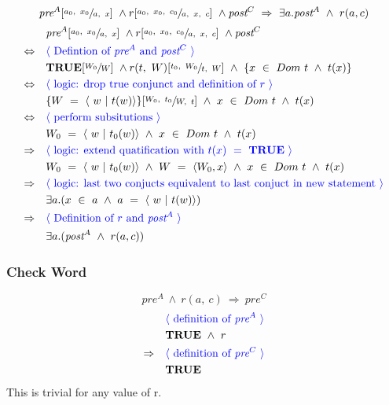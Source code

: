 \documentclass[a4paper, fleqn]{article}
\newcommand{\reason}[1]{\text{\textcolor{blue}{$\langle$ #1 $\rangle$}}}
\begin{document}
$$\textit{pre}^A[\sfrac{a_0,\ x_0}{a,\ x}]\ \land r[\sfrac{a_0,\ x_0,\ c_0}{a,\ x,\ c}]\ \land \textit{post}^{C}\ \Rightarrow\ \exists a.\textit{post}^A\ \land\ r(a, c)$$
\begin{align*}
		&\quad \textit{pre}^A[\sfrac{a_0,\ x_0}{a,\ x}]\ \land r[\sfrac{a_0,\ x_0,\ c_0}{a,\ x,\ c}]\ \land \textit{post}^{C} \\
		\Leftrightarrow&\quad \reason{Defintion of $\textit{pre}^A$ and $\textit{post}^C$} \\
		&\quad \textbf{TRUE}[\sfrac{W_0}{W}]\ \land r(t,\ W)[\sfrac{t_0,\ W_0}{t,\ W}]\ \land\ \{x\ \in\ Dom\ t\ \land\ t(x)\}\\
		\Leftrightarrow&\quad \reason{logic: drop true conjunct and definition of $r$} \\
		&\quad \{W\ =\ \langle\ w\ |\ t(w)\rangle\}[\sfrac{W_0,\ t_0}{W,\ t}]\ \land\  x\ \in\ Dom\ t\ \land\ t(x) \\
		\Leftrightarrow&\quad \reason{perform subsitutions} \\
		&\quad W_0\ =\ \langle\ w\ |\ t_0(w)\rangle\ \land\ x\ \in\ Dom\ t\ \land\ t(x)\\
		\Rightarrow&\quad\reason{logic: extend quatification with $t(x)\ =\ \textbf{TRUE}$} \\
		&\quad W_0\ =\ \langle\ w\ |\ t_0(w)\rangle\ \land\ W\ =\ \langle W_0, x\rangle\ \land\ x\ \in\ Dom\ t\ \land\ t(x)\ \\
		\Rightarrow&\quad \reason{logic: last two conjucts equivalent to last conjuct in new statement} \\
		&\quad \exists a.(x\ \in\ a\ \land\ a\ =\ \langle\ w\ |\ t(w)\rangle) \\
		\Rightarrow&\quad \reason{Definition of $r$ and $\textit{post}^A$} \\
		&\quad \exists a.(\textit{post}^A\ \land\ r(a, c))
\end{align*}

\subsubsection{Check Word}
$$\textit{pre}^A\ \land\ r(a,\ c)\ \Rightarrow\ \textit{pre}^C$$
\begin{align*}
		&\quad \reason{definition of $\textit{pre}^A$} \\
		&\quad \textbf{TRUE}\ \land\ r\\
		\Rightarrow&\quad\reason{definition of $\textit{pre}^C$} \\
		&\quad \textbf{TRUE} 
\end{align*}
This is trivial for any value of r.
\end{document}
